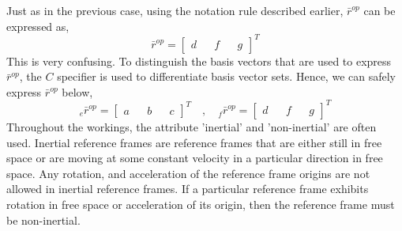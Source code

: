 Just as in the previous case, using the notation rule described earlier, $\bar{r}^{op}$ can be expressed as,
$$\bar{r}^{op} = \begin{bmatrix}
d && f && g
\end{bmatrix}^{T}$$
This is very confusing. 
To distinguish the basis vectors that are used to express $\bar{r}^{op}$, the $C$ specifier is used to differentiate basis vector sets. 
Hence, we can safely express $\bar{r}^{op}$ below,
$${}^{}_{e}\bar{r}^{op} = \begin{bmatrix}
a && b && c
\end{bmatrix}^{T} \quad,\quad {}^{}_{f}\bar{r}^{op} = \begin{bmatrix}
d && f && g
\end{bmatrix}^{T}$$
Throughout the workings, the attribute 'inertial' and 'non-inertial' are often used. 
Inertial reference frames are reference frames that are either still in free space or are moving at some constant velocity in a particular direction in free space. 
Any rotation, and acceleration of the reference frame origins are not allowed in inertial reference frames. 
If a particular reference frame exhibits rotation in free space or acceleration of its origin, then the reference frame must be non-inertial.
